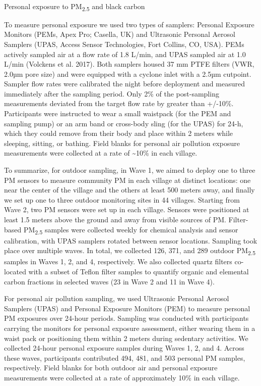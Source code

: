 \documentclass[
  letterpaper,
  DIV=11,
  numbers=noendperiod]{scrartcl}
\makeatletter
\let\oldparagraph\paragraph
\renewcommand{\paragraph}{
    \@ifstar
      \xxxParagraphStar
      \xxxParagraphNoStar
  }
\newcommand{\xxxParagraphStar}[1]{\oldparagraph*{#1}\mbox{}}
\newcommand{\xxxParagraphNoStar}[1]{\oldparagraph{#1}\mbox{}}
\makeatother
\begin{document}
\paragraph{\texorpdfstring{Personal exposure to PM\textsubscript{2.5}
and black
carbon}{Personal exposure to PM2.5 and black carbon}}\label{personal-exposure-to-pm2.5-and-black-carbon}

To measure personal exposure we used two types of samplers: Personal
Exposure Monitors (PEMs, Apex Pro; Casella, UK) and Ultrasonic Personal
Aerosol Samplers (UPAS, Access Sensor Technologies, Fort Collins, CO,
USA). PEMs actively sampled air at a flow rate of 1.8 L/min, and UPAS
sampled air at 1.0 L/min (Volckens et al. 2017). Both samplers housed 37
mm PTFE filters (VWR, 2.0µm pore size) and were equipped with a cyclone
inlet with a 2.5µm cutpoint. Sampler flow rates were calibrated the
night before deployment and measured immediately after the sampling
period. Only 2\% of the post-sampling measurements deviated from the
target flow rate by greater than +/-10\%. Participants were instructed
to wear a small waistpack (for the PEM and sampling pump) or an arm band
or cross-body sling (for the UPAS) for 24-h, which they could remove
from their body and place within 2 meters while sleeping, sitting, or
bathing. Field blanks for personal air pollution exposure measurements
were collected at a rate of \textasciitilde10\% in each village.

To summarize, for outdoor sampling, in Wave 1, we aimed to deploy one to
three PM sensors to measure community PM in each village at distinct
locations: one near the center of the village and the others at least
500 meters away, and finally we set up one to three outdoor monitoring
sites in 44 villages. Starting from Wave 2, two PM sensors were set up
in each village. Sensors were positioned at least 1.5 meters above the
ground and away from visible sources of PM. Filter-based
PM\textsubscript{2.5} samples were collected weekly for chemical
analysis and sensor calibration, with UPAS samplers rotated between
sensor locations. Sampling took place over multiple waves. In total, we
collected 126, 371, and 289 outdoor PM\textsubscript{2.5} samples in
Waves 1, 2, and 4, respectively. We also collected quartz filters
co-located with a subset of Teflon filter samples to quantify organic
and elemental carbon fractions in selected waves (23 in Wave 2 and 11 in
Wave 4).

For personal air pollution sampling, we used Ultrasonic Personal Aerosol
Samplers (UPAS) and Personal Exposure Monitors (PEM) to measure personal
PM exposures over 24-hour periods. Sampling was conducted with
participants carrying the monitors for personal exposure assessment,
either wearing them in a waist pack or positioning them within 2 meters
during sedentary activities. We collected 24-hour personal exposure
samples during Waves 1, 2, and 4. Across these waves, participants
contributed 494, 481, and 503 personal PM samples, respectively. Field
blanks for both outdoor air and personal exposure measurements were
collected at a rate of approximately 10\% in each village.
\end{document}
